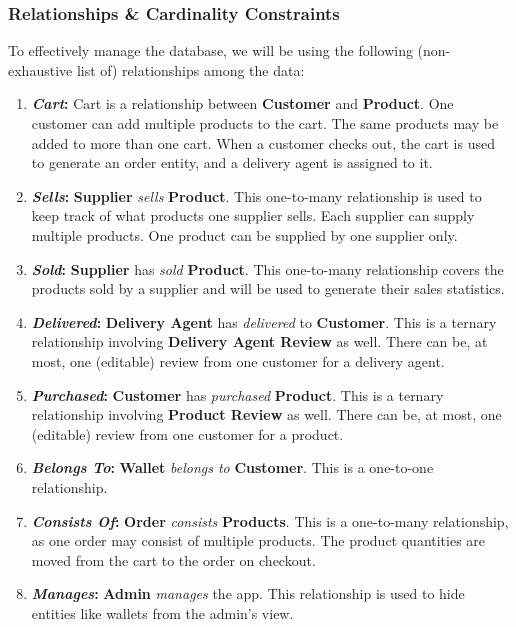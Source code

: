 \documentclass[12pt]{report}
\begin{document}
    \subsubsection*{Relationships \& Cardinality Constraints}
    To effectively manage the database, we will be using the following (non-exhaustive list of) relationships among the data:
    \begin{enumerate}
        \item \textbf{\textit{Cart}:}
        Cart is a relationship between \textbf{Customer} and \textbf{Product}.
        One customer can add multiple products to the cart.
        The same products may be added to more than one cart.
        When a customer checks out, the cart is used to generate an order entity, and a delivery agent is assigned to it.
        \item \textbf{\textit{Sells}:}
        \textbf{Supplier} \textit{sells} \textbf{Product}.
        This one-to-many relationship is used to keep track of what products one supplier sells.
        Each supplier can supply multiple products.
        One product can be supplied by one supplier only.
        \item \textbf{\textit{Sold}:}
        \textbf{Supplier} has \textit{sold} \textbf{Product}.
        This one-to-many relationship covers the products sold by a supplier and will be used to generate their sales statistics.
        \item \textbf{\textit{Delivered}:}
        \textbf{Delivery Agent} has \textit{delivered} to \textbf{Customer}.
        This is a ternary relationship involving \textbf{Delivery Agent Review} as well.
        There can be, at most, one (editable) review from one customer for a delivery agent.
        \item \textbf{\textit{Purchased}:}
        \textbf{Customer} has \textit{purchased} \textbf{Product}.
        This is a ternary relationship involving \textbf{Product Review} as well.
        There can be, at most, one (editable) review from one customer for a product.
        \item \textbf{\textit{Belongs To}:}
        \textbf{Wallet} \textit{belongs to} \textbf{Customer}.
        This is a one-to-one relationship.
        \item \textbf{\textit{Consists Of}:}
        \textbf{Order} \textit{consists} \textbf{Products}.
        This is a one-to-many relationship, as one order may consist of multiple products.
        The product quantities are moved from the cart to the order on checkout.
        \item \textbf{\textit{Manages}:}
        \textbf{Admin} \textit{manages} the app.
        This relationship is used to hide entities like wallets from the admin's view.
    \end{enumerate}
\end{document}
